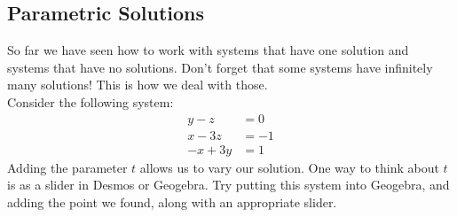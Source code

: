 \documentclass[12pt,fleqn]{book}
\begin{document}
\subsection*{Parametric Solutions}
So far we have seen how to work with systems that have one solution and systems that have no solutions.  Don't forget that some systems have infinitely many solutions!  This is how we deal with those.
\\[1em]
Consider the following system:
\begin{align*}
y-z &= 0 \\
x-3z &= -1 \\
-x+3y&=1
\end{align*}
\vfill
Adding the parameter $t$ allows us to vary our solution.  One way to think about $t$ is as a slider in Desmos or Geogebra.  Try putting this system into Geogebra, and adding the point we found, along with an appropriate slider.
\clearpage
\end{document}
